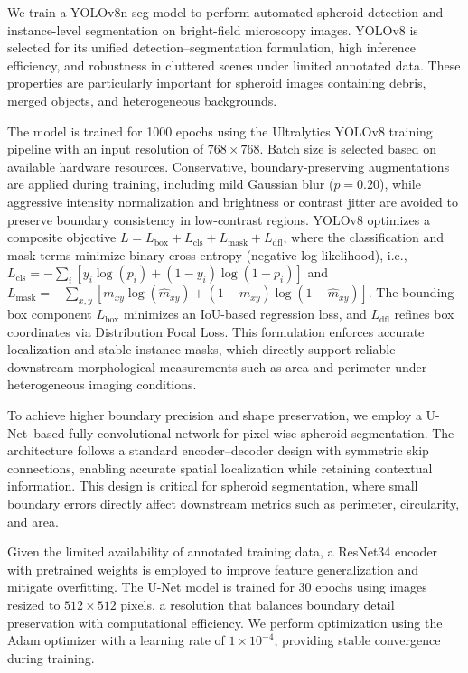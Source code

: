 \documentclass[sigconf, nonacm]{acmart}
\begin{document}
We train a YOLOv8n-seg model to perform automated spheroid detection and instance-level segmentation on bright-field microscopy images. YOLOv8 is selected for its unified detection--segmentation formulation, high inference efficiency, and robustness in cluttered scenes under limited annotated data. These properties are particularly important for spheroid images containing debris, merged objects, and heterogeneous backgrounds.

The model is trained for 1000 epochs using the Ultralytics YOLOv8 training pipeline with an input resolution of $768 \times 768$. Batch size is selected based on available hardware resources. Conservative, boundary-preserving augmentations are applied during training, including mild Gaussian blur ($p = 0.20$), while aggressive intensity normalization and brightness or contrast jitter are avoided to preserve boundary consistency in low-contrast regions.
YOLOv8 optimizes a composite objective $L = L_{\text{box}} + L_{\text{cls}} + L_{\text{mask}} + L_{\text{dfl}}$, where the classification and mask terms minimize binary cross-entropy (negative log-likelihood), i.e., $L_{\text{cls}} = -\sum_i \left[y_i \log(p_i) + (1-y_i)\log(1-p_i)\right]$ and $L_{\text{mask}} = -\sum_{x,y} \left[m_{xy}\log(\hat{m}_{xy}) + (1-m_{xy})\log(1-\hat{m}_{xy})\right]$. The bounding-box component $L_{\text{box}}$ minimizes an IoU-based regression loss, and $L_{\text{dfl}}$ refines box coordinates via Distribution Focal Loss. This formulation enforces accurate localization and stable instance masks, which directly support reliable downstream morphological measurements such as area and perimeter under heterogeneous imaging conditions.



To achieve higher boundary precision and shape preservation, we employ a U-Net--based fully convolutional network \cite{ref2} for pixel-wise spheroid segmentation. The architecture follows a standard encoder--decoder design with symmetric skip connections, enabling accurate spatial localization while retaining contextual information. This design is critical for spheroid segmentation, where small boundary errors directly affect downstream metrics such as perimeter, circularity, and area.

Given the limited availability of annotated training data, a ResNet34 encoder with pretrained weights is employed to improve feature generalization and mitigate overfitting. The U-Net model is trained for 30 epochs using images resized to \(512 \times 512\) pixels, a resolution that balances boundary detail preservation with computational efficiency. We perform optimization using the Adam optimizer with a learning rate of \(1 \times 10^{-4}\), providing stable convergence during training.
\end{document}
